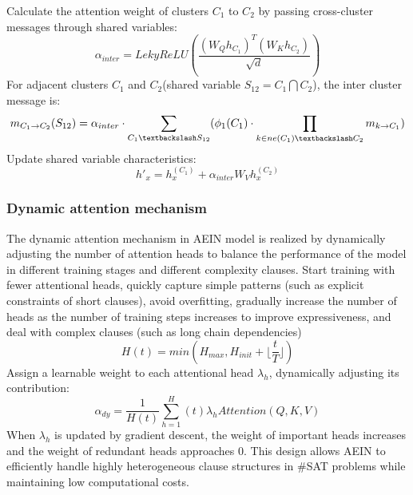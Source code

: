Calculate the attention weight of clusters \(C_1\)  to \(C_2\)  by passing cross-cluster messages through shared variables:
\begin{equation}
\alpha_{inter}=LekyReLU(\frac{(W_Qh_{C_1})^T(W_Kh_{C_2})}{\sqrt{d}})
\end{equation}
For adjacent clusters \(C_1\) and \(C_2\)(shared variable \(S_{12}=C_1\bigcap C_2\)), the inter cluster message is:
\begin{equation}
    m_{C_1\rightarrow C_2}(S_{12})=\alpha_{inter}\cdot\sum_{C_1\textbackslash S_{12}}(\phi_1(C_1)\cdot\prod_{k\in ne(C_1)\textbackslash C_2}m_{k\rightarrow C_1})
\end{equation}
Update shared variable characteristics:
\begin{equation}
h'_x=h_x^{(C_1)}+\alpha_{inter}W_Vh_x^{(C_2)}
\end{equation}
\subsubsection{Dynamic attention mechanism}
The dynamic attention mechanism in AEIN model is realized by dynamically adjusting the number of attention heads to balance the performance of the model in different training stages and different complexity clauses. Start training with fewer attentional heads, quickly capture simple patterns (such as explicit constraints of short clauses), avoid overfitting, gradually increase the number of heads as the number of training steps increases to improve expressiveness, and deal with complex clauses (such as long chain dependencies) 
\begin{equation}
H(t)=min(H_{max},H_{init}+\lfloor\frac{t}{T}\rfloor)
\end{equation}
Assign a learnable weight to each attentional head \(\lambda_h\), dynamically adjusting its contribution:
\begin{equation}
\alpha_{dy}=\frac{1}{H(t)}\sum_{h=1}^H(t) \lambda_h Attention(Q,K,V)
\end{equation}
When \(\lambda_h\) is updated by gradient descent, the weight of important heads increases and the weight of redundant heads approaches 0.
This design allows AEIN to efficiently handle highly heterogeneous clause structures in \#SAT problems while maintaining low computational costs.
